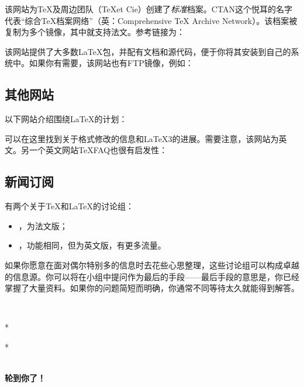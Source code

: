 该网站为\TeX 及周边团队（\TeX et Cie）创建了\emph{标准}档案。CTAN这个悦耳的名字代表``综合\TeX 档案网络''（英：Comprehensive TeX Archive Network）。该档案被复制为多个镜像，其中就支持法文。参考链接为：

\begin{dmd}
\end{dmd}

该网站提供了大多数\LaTeX 包，并配有文档和源代码，便于你将其安装到自己的系统中。如果你有需要，该网站也有FTP镜像，例如：

\begin{dmd}
\end{dmd}

\subsection{其他网站}

以下网站介绍围绕\LaTeX 的计划：

\begin{dmd}
\end{dmd}

可以在这里找到关于\LaTeXe 格式修改的信息和\LaTeX 3的进展。需要注意，该网站为英文。另一个英文网站\TeX FAQ也很有启发性：

\begin{dmd}
\end{dmd}

\subsection{新闻订阅}

有两个关于\TeX 和\LaTeX 的讨论组：

\begin{itemize}
    \item {}，为法文版；
    \item {}，功能相同，但为英文版，有更多流量。
\end{itemize}

如果你愿意在面对偶尔特别多的信息时去花些心思整理，这些讨论组可以构成卓越的信息源。你可以将在小组中提问作为最后的手段——最后手段的意思是，你已经掌握了大量资料。如果你的问题简短而明确，你通常不同等待太久就能得到解答。

~\\

\begin{center}
    *

    *\quad *

    ~\\

    \textbf{轮到你了！}
\end{center}